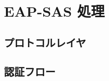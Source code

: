 \section{EAP-SAS 処理}
\toc
\subsection{プロトコルレイヤ}
\begin{frame}{\ft}
    
\end{frame}
\subsection{認証フロー}
\begin{frame}{\ft}
    
\end{frame}
\begin{frame}{\ft}
    
\end{frame}